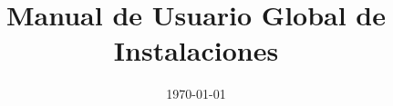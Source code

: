 ﻿\documentclass[12pt,a4paper]{article}
\title{Manual de Usuario Global de Instalaciones}
\author{}
\date{\today}
\begin{document}
\maketitle
\tableofcontents
\newpage

\manualnotalinks




\end{document}
